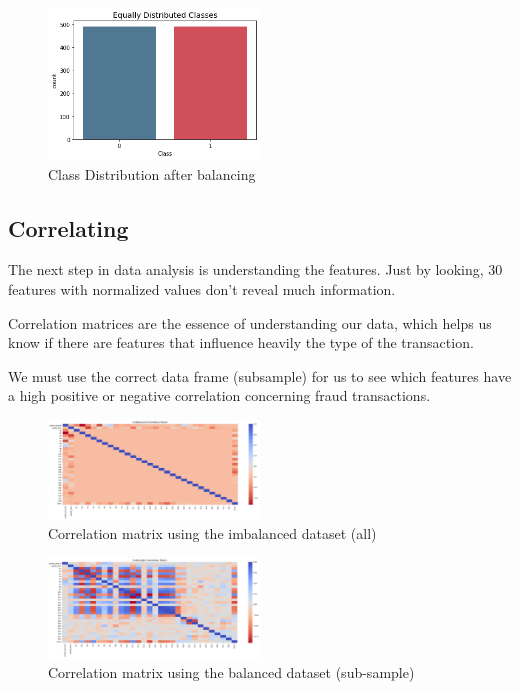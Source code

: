 \documentclass[conference]{IEEEtran}
\begin{document}
\begin{figure}[H]
    \centering\includegraphics[width=0.5\textwidth]{images/classes_after_balancing.png}
    \caption{Class Distribution after balancing}
    \label{fig:example}
\end{figure}

\subsection{Correlating}
The next step in data analysis is understanding the features. Just by looking, 30 features with normalized values don't reveal much information.

Correlation matrices are the essence of understanding our data, which helps us know if there are features that influence heavily the type of the transaction.

We must use the correct data frame (subsample) for us to see which features have a high positive or negative correlation concerning fraud transactions.

\begin{figure}[H]
    \centering\includegraphics[width=0.5\textwidth]{images/imbalanced_corr_matrix.png}
    \caption{Correlation matrix using the imbalanced dataset (all)}
    \label{fig:example}
\end{figure}

\begin{figure}[H]
    \centering\includegraphics[width=0.5\textwidth]{images/balanced_corr_matrix.png}
    \caption{Correlation matrix using the balanced dataset (sub-sample)}
    \label{fig:correlation_sub}
\end{figure}
\end{document}
